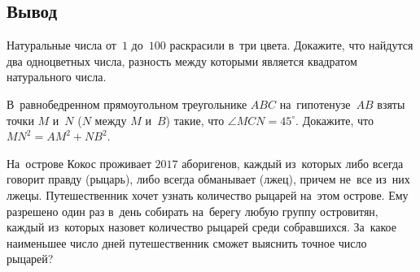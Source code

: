


\subsection*{Вывод}

\begin{problems}

\item
Натуральные числа от~$1$ до~$100$ раскрасили в~три цвета.
Докажите, что найдутся два одноцветных числа, разность между которыми является
квадратом натурального числа.

\item
В~равнобедренном прямоугольном треугольнике $ABC$ на~гипотенузе~$AB$ взяты
точки $M$ и~$N$ ($N$ между $M$ и~$B$) такие, что $\angle MCN = 45^{\circ}$.
Докажите, что $MN^2 = AM^2 + NB^2$.

\item
На~острове Кокос проживает $2017$ аборигенов, каждый из~которых либо всегда
говорит правду (рыцарь), либо всегда обманывает (лжец), причем не~все из~них
лжецы.
Путешественник хочет узнать количество рыцарей на~этом острове.
Ему разрешено один раз в~день собирать на~берегу любую группу островитян,
каждый из~которых назовет количество рыцарей среди собравшихся.
За~какое наименьшее число дней путешественник сможет выяснить точное число
рыцарей?

\end{problems}

